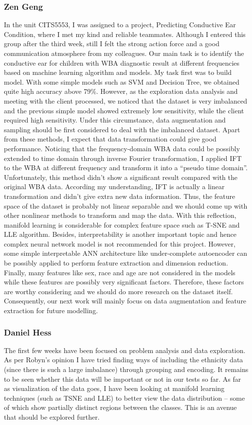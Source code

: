 \documentclass[11pt,a4paper]{article}
\begin{document}
\subsubsection*{Zen Geng}
In the unit CITS5553, I was assigned to a project, Predicting Conductive Ear Condition, where I met my kind and reliable teammates. Although I entered this group after the third week, still I felt the strong action force and a good communication atmosphere from my colleagues. Our main task is to identify the conductive ear for children with WBA diagnostic result at different frequencies based on machine learning algorithm and models. My task first was to build model. With some simple models such as SVM and Decision Tree, we obtained quite high accuracy above 79\%. However, as the exploration data analysis and meeting with the client processed, we noticed that the dataset is very imbalanced and the previous simple model showed extremely low sensitivity, while the client required high sensitivity. Under this circumstance, data augmentation and sampling should be first considered to deal with the imbalanced dataset. Apart from these methods, I expect that data transformation could give good performance. Noticing that the frequency-domain WBA data could be possibly extended to time domain through inverse Fourier transformation, I applied IFT to the WBA at different frequency and transform it into a “pseudo time domain”. Unfortunately, this method didn’t show a significant result compared with the original WBA data. According my understanding, IFT is actually a linear transformation and didn’t give extra new data information. Thus, the feature space of the dataset is probably not linear separable and we should come up with other nonlinear methods to transform and map the data. With this reflection, manifold learning is considerable for complex feature space such as T-SNE and LLE algorithm. Besides, interpretability is another important topic and hence complex neural network model is not recommended for this project. However, some simple interpretable ANN architecture like under-complete autoencoder can be possibly applied to perform feature extraction and dimension reduction. Finally, many features like sex, race and age are not considered in the models while these features are possibly very significant factors. Therefore, these factors are worthy considering and we should do more research on the dataset itself. Consequently, our next work will mainly focus on data augmentation and feature extraction for future modelling.  
\subsubsection*{Daniel Hess}
The first few weeks have been focused on problem analysis and data exploration. As per Robyn’s opinion I have tried finding ways of including the ethnicity data (since there is such a large imbalance) through grouping and encoding. It remains to be seen whether this data will be important or not in our tests so far. As far as visualization of the data goes, I have been looking at manifold learning techniques (such as TSNE and LLE) to better view the data distribution – some of which show partially distinct regions between the classes. This is an avenue that should be explored further. 
\end{document}
